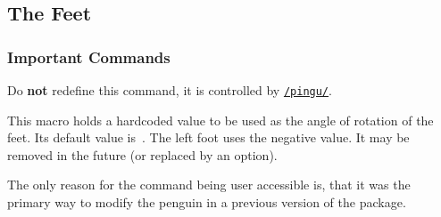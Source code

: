 \documentclass[parskip=half,english,numbers=noenddot,footnotes=nomultiple,oneside]{scrartcl}
\makeatletter
\let\say\enquote
\def\lpingu#1{\lstinline[style=lstpingu,language=pingulang]'#1'}
\let\@explainsuff\@empty
\let\@labelhack\@empty
\newcommand*\keyref[2][/pingu/]{\hyperref[pk:#1#2]{\lpingu{#1#2}}}
\newcommand*\cmdref[1]{\hyperref[pk:/pingu/:bs:#1]{\lpingu{\\#1}}}
\newenvironment{commandexplain}[3][]{%
\begingroup
\def\@labelhack{/pingu/}%
\def\mand##1{\texttt{\{\textsf{\smaller##1}\}}}%
\def\@pingu@command@keypartner{#1}%
\newcommand\opt[2][]{\texttt{\textit{[\textsf{\smaller##2\ifx!##1!\else\textcolor{gray}{\smaller\sffamily=##1}\fi}]}}}%
\def\@explainsuff{#3}%
\keyexplain[]{\\#2}{}{}%
\ifx\@pingu@command@keypartner\@empty\else
{\@declaredcolor{gray}\footnotesize Do \textbf{not} redefine this command, it is controlled by \keyref{#1}.}\par\fi
}{\endkeyexplain\endgroup}
\makeatother
\begin{document}





\subsection{The Feet}\label{internal:feet}

\subsubsection{Important Commands}

\begin{commandexplain}{basicfeetbend}{}
	This macro holds a hardcoded value to be used as the angle of rotation of the feet. Its default value is~\basicfeetbend. The left foot uses the negative value. It may be removed in the future (or replaced by an option).

	The only reason for the command being user accessible is, that it was the primary way to modify the penguin in a previous version of the package.
\end{commandexplain}
\end{document}
